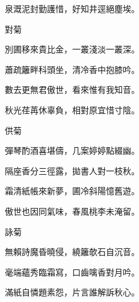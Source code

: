 \begin{poem}
    \begin{pl}泉溉泥封勤護惜，好知井逕絕塵埃。\end{pl}
    \emptypl

    \begin{pl}對菊　\end{pl}

    \begin{pl}別圃移來貴比金，一叢淺淡一叢深。\end{pl}

    \begin{pl}蕭疏籬畔科頭坐，清冷香中抱膝吟。\end{pl}

    \begin{pl}數去更無君傲世，看來惟有我知音。\end{pl}

    \begin{pl}秋光荏苒休辜負，相對原宜惜寸陰。\end{pl}
    \emptypl

    \begin{pl}供菊　\end{pl}

    \begin{pl}彈琴酌酒喜堪儔，几案婷婷點綴幽。\end{pl}

    \begin{pl}隔座香分三徑露，拋書人對一枝秋。\end{pl}

    \begin{pl}霜清紙帳來新夢，圃冷斜陽憶舊遊。\end{pl}

    \begin{pl}傲世也因同氣味，春風桃李未淹留。\end{pl}
    \emptypl

    \begin{pl}詠菊　\end{pl}

    \begin{pl}無賴詩魔昏曉侵，繞籬欹石自沉音。\end{pl}

    \begin{pl}毫端蘊秀臨霜寫，口齒噙香對月吟。\end{pl}

    \begin{pl}滿紙自憐題素怨，片言誰解訴秋心。\end{pl}


\end{poem}
